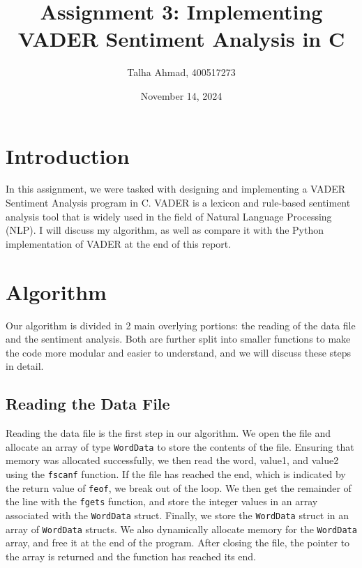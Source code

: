 \documentclass[12pt]{article}
\begin{document}
\title{Assignment 3: Implementing VADER Sentiment Analysis in C}
\author{Talha Ahmad, 400517273}
\date{November 14, 2024}
\maketitle

\section{Introduction}

In this assignment, we were tasked with designing and implementing a VADER Sentiment Analysis program in C.
VADER is a lexicon and rule-based sentiment analysis tool that is widely used in the field of Natural Language Processing (NLP).
I will discuss my algorithm, as well as compare it with the Python implementation of VADER at the end of this report.

\section{Algorithm}

Our algorithm is divided in 2 main overlying portions: the reading of the data file and the sentiment analysis.
Both are further split into smaller functions to make the code more modular and easier to understand, and we will discuss these steps in detail.

\subsection{Reading the Data File}

Reading the data file is the first step in our algorithm.
We open the file and allocate an array of type \texttt{WordData} to store the contents of the file.
Ensuring that memory was allocated successfully, we then read the word, value1, and value2 using the \texttt{fscanf} function.
If the file has reached the end, which is indicated by the return value of \texttt{feof}, we break out of the loop.
We then get the remainder of the line with the \texttt{fgets} function, and store the integer values in an array associated with the \texttt{WordData} struct.
Finally, we store the \texttt{WordData} struct in an array of \texttt{WordData} structs.
We also dynamically allocate memory for the \texttt{WordData} array, and free it at the end of the program.
After closing the file, the pointer to the array is returned and the function has reached its end.
\end{document}
